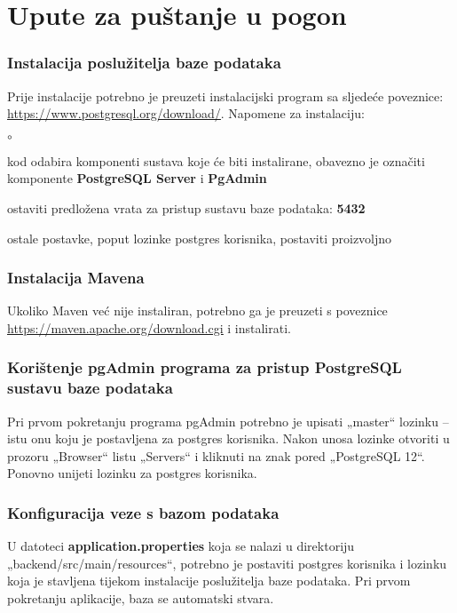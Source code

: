 {		\section{Upute za puštanje u pogon}
		
			\subsubsection{Instalacija poslužitelja baze podataka}
		
			Prije instalacije potrebno je preuzeti instalacijski program sa sljedeće poveznice:
				\href{https://www.postgresql.org/download/}{\underline{https://www.postgresql.org/download/}}.
			\newline\newline
			Napomene za instalaciju:
			\begin{list}{$\circ$}{}
				\item  kod odabira komponenti sustava koje će biti
				instalirane, obavezno je označiti komponente
	 			\textbf{PostgreSQL Server} i \textbf{PgAdmin} 

				\item  ostaviti predložena vrata za pristup
				sustavu baze podataka: \textbf{5432}
				\item  ostale postavke, poput lozinke postgres korisnika, postaviti proizvoljno
			\end{list}
		
			\subsubsection{Instalacija Mavena}
			Ukoliko Maven već nije instaliran, potrebno ga je preuzeti s poveznice\newline
			\href{https://maven.apache.org/download.cgi}{\underline{https://maven.apache.org/download.cgi}} i instalirati.
		
			\subsubsection{Korištenje pgAdmin programa za pristup PostgreSQL sustavu baze podataka}
			
			Pri prvom pokretanju programa pgAdmin potrebno je upisati
			„master“ lozinku – istu onu koju je postavljena za postgres korisnika.
			Nakon unosa lozinke otvoriti u prozoru „Browser“ listu
			„Servers“ i kliknuti na znak pored „PostgreSQL 12“.
			Ponovno unijeti lozinku za postgres korisnika.
			
			\subsubsection{Konfiguracija veze s bazom podataka}
			U datoteci \textbf{application.properties} koja se nalazi u direktoriju
			\newline
			„backend/src/main/resources“, potrebno je postaviti postgres korisnika i lozinku koja je stavljena tijekom instalacije poslužitelja baze podataka. Pri prvom pokretanju aplikacije, baza se automatski stvara.
			
}
